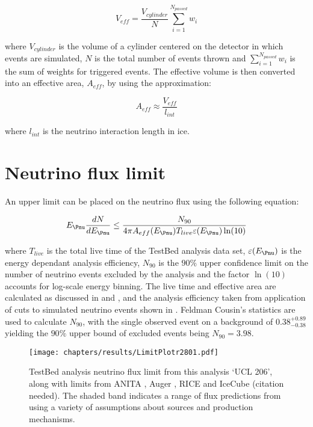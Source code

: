 \begin{equation}
  V_{eff} = \frac {V_{cylinder}}{N} \sum_{i=1}^{N_{passed}} w_{i}
\end{equation}

\noindent where $V_{cylinder}$ is the volume of a cylinder centered on the detector in which events are simulated, $N$ is the total number of events thrown and $\sum_{i=1}^{N_{passed}} w_{i}$ is the sum of weights for triggered events. The effective volume is then converted into an effective area, $A_{eff}$, by using the approximation:

\begin{equation}
  A_{eff} \approx \frac{V_{eff}}{l_{int}}
\end{equation}

\noindent where $l_{int}$ is the neutrino interaction length in ice. 

\section{Neutrino flux limit}
\label{sec:Results:Limit}

An upper limit can be placed on the neutrino flux using the following equation:

\begin{equation}
  E_{\Pnu} \frac {dN}{dE_{\Pnu}} \leq \frac{N_{90}}{4\pi A_{eff}(E_{\Pnu}) T_{live} \varepsilon(E_{\Pnu}) \ln(10)}
\end{equation}

\noindent where $T_{live}$ is the total live time of the TestBed analysis data set, $\varepsilon(E_{\Pnu})$ is the energy dependant analysis efficiency, $N_{90}$ is the $90\%$ upper confidence limit on the number of neutrino events excluded by the analysis and the factor $\ln(10)$ accounts for log-scale energy binning. The live time and effective area are calculated as discussed in  and , and the analysis efficiency taken from application of cuts to simulated neutrino events shown in . Feldman Cousin's statistics are used to calculate $N_{90}$, with the single observed event on a background of $0.38^{+0.89}_{-0.38}$ yielding the $90\%$ upper bound of excluded events being $N_{90}=3.98$.

\begin{figure}[htpb]
  \texttt{[image: chapters/results/LimitPlotr2801.pdf]}
  \caption{TestBed analysis neutrino flux limit from this analysis `UCL 206', along with limits from ANITA \cite{PhysRevD.82.022004}, Auger \cite{Abraham:2009eh}, RICE \cite{PhysRevD.73.082002} and IceCube (citation needed). The shaded band indicates a range of flux predictions from \cite{Kotera.2010} using a variety of assumptions about sources and production mechanisms.}
  \label{fig:Results:Limit-Plot}
\end{figure}

